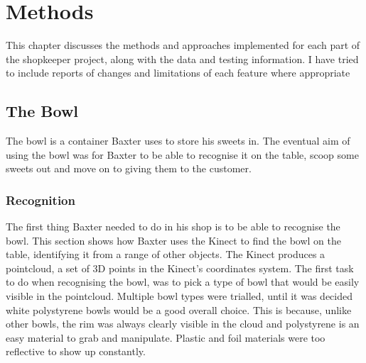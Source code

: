 \chapter{Methods}
\label{chapter4}
This chapter discusses the methods and approaches implemented for each part of the shopkeeper project, along with the data and testing information. I have tried to include reports of changes and limitations of each feature where appropriate
\section{The Bowl}
The bowl is a container Baxter uses to store his sweets in. The eventual aim of using the bowl was for Baxter to be able to recognise it on the table, scoop some sweets out and move on to giving them to the customer.
\subsection{Recognition}
The first thing Baxter needed to do in his shop is to be able to recognise the bowl. This section shows how Baxter uses the Kinect to find the bowl on the table, identifying it from a range of other objects. The Kinect produces a pointcloud, a set of 3D points in the Kinect's coordinates system. The first task to do when recognising the bowl, was to pick a type of bowl that would be easily visible in the pointcloud. Multiple bowl types were trialled, until it was decided white polystyrene bowls would be a good overall choice. This is because, unlike other bowls, the rim was always clearly visible in the cloud and polystyrene is an easy material to grab and manipulate. Plastic and foil materials were too reflective to show up constantly.
